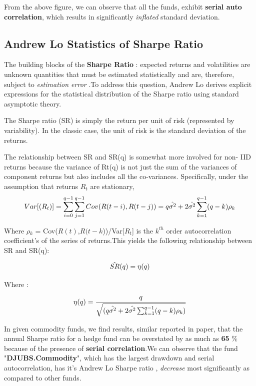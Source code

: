\documentclass[12pt,letterpaper,english]{article}
\begin{document}
From the above figure, we can observe that all the funds, exhibit \textbf{serial auto correlation}, which results in significantly \emph{inflated} standard deviation.
\subsection{Andrew Lo Statistics of Sharpe Ratio}

The building blocks of the \textbf{Sharpe Ratio} : expected returns and volatilities  are unknown quantities that must be estimated statistically and are,
therefore, subject to \emph{estimation error} .To address this question, Andrew Lo derives explicit expressions for the statistical distribution of the Sharpe ratio using
standard asymptotic theory. 

The Sharpe ratio (SR) is simply the return per unit of risk (represented by variability).  In the classic case, the unit of risk is the standard deviation of the returns.
 

The relationship between SR and SR(q) is somewhat more involved for non-
IID returns because the variance of Rt(q) is not just the sum of the variances of component returns but also includes all the co-variances. Specifically, under
the assumption that returns \(R_t\) are stationary,
\begin{equation}
Var[(R_t)] =   \sum_{i=0}^{q-1} \sum_{j=1}^{q-1} Cov(R(t-i),R(t-j)) = q\hat{\sigma^2} + 2\hat{\sigma^2} \sum_{k=1}^{q-1} (q-k)\rho_k \\
\end{equation}

Where  $\rho$\(_k\) = Cov(\(R(t)\),\(R(t-k\)))/Var[\(R_t\)] is the \(k^{th}\) order autocorrelation coefficient's of the series of returns.This yields the following relationship between SR and SR(q):

\begin{equation}
\hat{SR}(q)  =  \eta(q) \\
\end{equation}

Where :

\begin{equation}
\eta(q)  =  \frac{q}{\sqrt{(q\hat{\sigma^2} + 2\hat{\sigma^2} \sum_{k=1}^{q-1} (q-k)\rho_k)}} \\
\end{equation}
 
In given commodity funds, we find results, similar reported in paper, that the annual Sharpe ratio for a hedge fund can be overstated by as much as \textbf{65} \% because of the presence of \textbf{serial correlation}.We can observe that the fund "\textbf{DJUBS.Commodity}", which has the largest drawdown and serial autocorrelation, has it's Andrew Lo Sharpe ratio , \emph{decrease} most significantly as compared to other funds.
\end{document}
